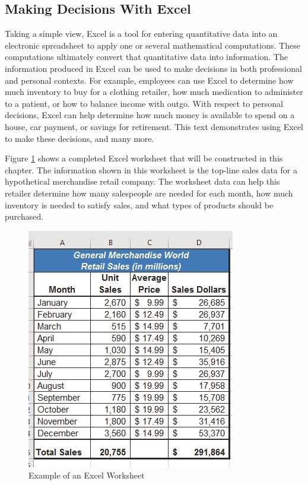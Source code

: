 \subsection{Making Decisions With Excel}

Taking a simple view, Excel is a tool for entering quantitative data into an electronic spreadsheet to apply one or several mathematical computations. These computations ultimately convert that quantitative data into information. The information produced in Excel can be used to make decisions in both professional and personal contexts. For example, employees can use Excel to determine how much inventory to buy for a clothing retailer, how much medication to administer to a patient, or how to balance income with outgo. With respect to personal decisions, Excel can help determine how much money is available to spend on a house, car payment, or savings for retirement. This text demonstrates using Excel to make these decisions, and many more.

Figure \ref{01:fig01} shows a completed Excel worksheet that will be constructed in this chapter. The information shown in this worksheet is the top-line sales data for a hypothetical merchandise retail company. The worksheet data can help this retailer determine how many salespeople are needed for each month, how much inventory is needed to satisfy sales, and what types of products should be purchased.

\begin{figure}[H]
	\centering
	\includegraphics[width=\maxwidth{.95\linewidth}]{gfx/ch01_fig01}
	\caption{Example of an Excel Worksheet}
	\label{01:fig01}
\end{figure}

